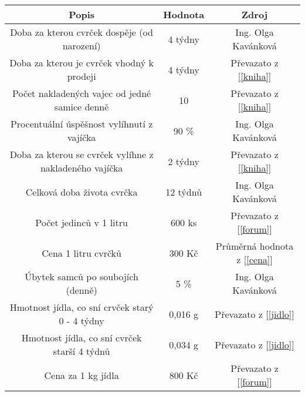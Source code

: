 \documentclass{article}
\begin{document}
    \begin{table}[h]
        \begin{tabular}{|c|c|c|}
        \hline
        \textbf{Popis}                                         & \textbf{Hodnota}      & \textbf{Zdroj}                                       \\ \hline
        Doba za kterou cvrček dospěje (od narození)            & 4 týdny               & Ing. Olga Kavánková                                  \\ \hline
        Doba za kterou je cvrček vhodný k prodeji              & 4 týdny               & Převazato z [\ref{kniha}]                            \\ \hline
        Počet nakladených vajec od jedné samice denně          & 10                    & Převazato z [\ref{kniha}]                            \\ \hline
        Procentuální úspěšnost vylíhnutí z vajíčka             & 90 \%                 & Ing. Olga Kavánková                                  \\ \hline
        Doba za kterou se cvrček vylíhne z nakladeného vajíčka & 2 týdny               & Převazato z [\ref{kniha}]                            \\ \hline
        Celková doba života cvrčka                             & 12 týdnů              & Ing. Olga Kavánková                                  \\ \hline
        Počet jedinců v 1 litru                                & 600 ks                & Převazato z [\ref{forum}]                            \\ \hline
        Cena 1 litru cvrčků                                    & 300 Kč                & Průměrná hodnota z [\ref{cena}]                      \\ \hline
        Úbytek samců po soubojích (denně)                      & 5 \%                  & Ing. Olga Kavánková                                  \\ \hline
        Hmotnost jídla, co sní crvček starý 0 - 4 týdny        & 0,016 g               & Převazato z [\ref{jidlo}]                            \\ \hline
        Hmotnost jídla, co sní cvrček starší 4 týdnů           & 0,034 g               & Převazato z [\ref{jidlo}]                            \\ \hline
        Cena za 1 kg jídla                                     & 800 Kč                & Převazato z [\ref{forum}]                            \\ \hline
        \end{tabular}
    \end{table}
\end{document}
